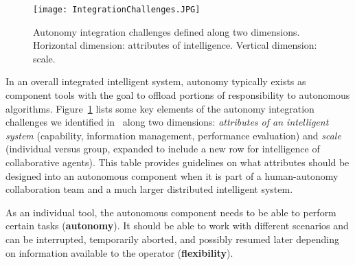 

\begin{figure}
\centering
\texttt{[image: IntegrationChallenges.JPG]}
\caption{Autonomy integration challenges defined along two dimensions. Horizontal dimension: attributes of intelligence. Vertical dimension: scale.}
\label{challenges}
\end{figure}

In an overall integrated intelligent system, autonomy typically exists as component tools with the goal to offload portions of responsibility to autonomous algorithms. Figure~\ref{challenges} lists some key elements of the autonomy integration challenges we identified in~\cite{Lin2010Supporting} along two dimensions: \textit{attributes of an intelligent system} (capability, information management, performance evaluation) and \textit{scale} (individual versus group, expanded to include a new row for intelligence of collaborative agents). This table provides guidelines on what attributes should be designed into an autonomous component when it is part of a human-autonomy collaboration team and a much larger distributed intelligent system. 

As an individual tool, the autonomous component needs to be able to perform certain tasks (\textbf{autonomy}). It should be able to work with different scenarios and can be interrupted, temporarily aborted, and possibly resumed later depending on information available to the operator (\textbf{flexibility}). 

